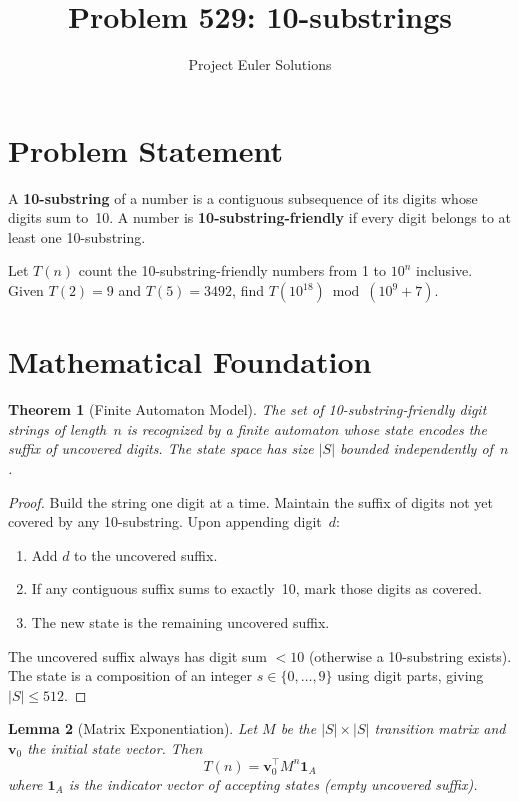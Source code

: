 \documentclass[11pt]{article}
\title{Problem 529: 10-substrings}
\author{Project Euler Solutions}
\date{}
\newtheorem{theorem}{Theorem}
\newtheorem{lemma}[theorem]{Lemma}
\begin{document}
\maketitle

\section{Problem Statement}
A \textbf{10-substring} of a number is a contiguous subsequence of its digits whose digits sum to~10. A number is \textbf{10-substring-friendly} if every digit belongs to at least one 10-substring.

Let $T(n)$ count the 10-substring-friendly numbers from 1 to $10^n$ inclusive. Given $T(2) = 9$ and $T(5) = 3492$, find $T(10^{18}) \bmod (10^9+7)$.

\section{Mathematical Foundation}

\begin{theorem}[Finite Automaton Model]
The set of 10-substring-friendly digit strings of length~$n$ is recognized by a finite automaton whose state encodes the suffix of uncovered digits. The state space has size $|S|$ bounded independently of~$n$.
\end{theorem}

\begin{proof}
Build the string one digit at a time. Maintain the suffix of digits not yet covered by any 10-substring. Upon appending digit~$d$:
\begin{enumerate}
    \item Add $d$ to the uncovered suffix.
    \item If any contiguous suffix sums to exactly~10, mark those digits as covered.
    \item The new state is the remaining uncovered suffix.
\end{enumerate}
The uncovered suffix always has digit sum $< 10$ (otherwise a 10-substring exists). The state is a composition of an integer $s \in \{0,\ldots,9\}$ using digit parts, giving $|S| \le 512$.
\end{proof}

\begin{lemma}[Matrix Exponentiation]
Let $M$ be the $|S| \times |S|$ transition matrix and $\mathbf{v}_0$ the initial state vector. Then
\[
T(n) = \mathbf{v}_0^\top M^n \mathbf{1}_A
\]
where $\mathbf{1}_A$ is the indicator vector of accepting states (empty uncovered suffix).
\end{lemma}
\end{document}
